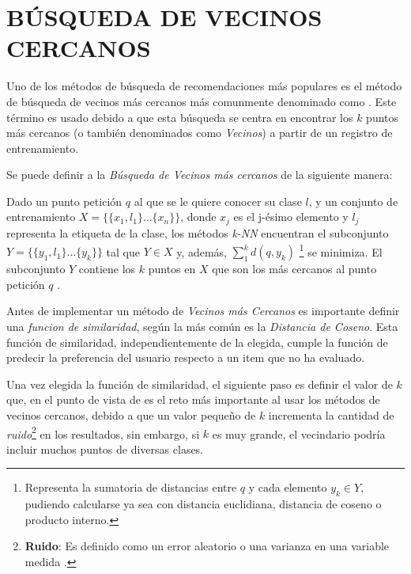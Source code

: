 \section{BÚSQUEDA DE VECINOS CERCANOS}

Uno de los métodos de búsqueda de recomendaciones más populares es el método de búsqueda de vecinos más cercanos más comunmente denominado como . Este término es usado debido a que esta búsqueda se centra en encontrar los $k$ puntos más cercanos (o también denominados como \textit{Vecinos}) a partir de un registro de entrenamiento\parencite{10.5555/1941884}.

Se puede definir a la \textit{Búsqueda de Vecinos más cercanos} de la siguiente manera: 


\begin{definition}
    Dado un punto petición $q$ al que se le quiere conocer su clase $l$, y un conjunto de entrenamiento $X = \{ \{x_1, l_1\}\hdots\{x_n\} \}$, donde $x_j$ es el j-ésimo elemento y $l_j$ representa la etiqueta de la clase, los métodos \textit{k-NN} encuentran el subconjunto $Y = \{\{y_1, l_1\} \hdots \{y_k\} \}$ tal que $Y \in X$ y, además, $\sum^k_1d(q, y_k)$ \footnote{Representa la sumatoria de distancias entre $q$ y cada elemento $y_k \in Y$, pudiendo calcularse ya sea con distancia euclidiana, distancia de coseno o producto interno.}  se minimiza. El subconjunto $Y$ contiene los $k$ puntos en $X$ que son los más cercanos al punto petición $q$ \parencite{10.5555/1941884}.  
\end{definition}

Antes de implementar un método de \textit{Vecinos más Cercanos} es importante definir una \textit{funcion de similaridad}, según \parencite{Aggarwal2016} la más común es la \textit{Distancia de Coseno}.  Esta función de similaridad, independientemente de la elegida, cumple la función de predecir la preferencia del usuario respecto a un item que no ha evaluado. 

Una vez elegida la función de similaridad, el siguiente paso es definir el valor de $k$ que, en el punto de vista de \parencite{10.5555/1941884} es el reto más importante al usar los métodos de vecinos cercanos, debido a que un valor pequeño de $k$ incrementa la cantidad de \textit{ruido}\footnote{\textbf{Ruido}: Es definido como un error aleatorio o una varianza en una variable medida \parencite{alasadi2017review}. } en los resultados, sin embargo, si $k$ es muy grande, el vecindario podría incluir muchos puntos de diversas clases.
